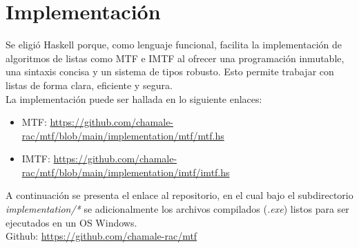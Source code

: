 \section{Implementación}

Se eligió Haskell porque, como lenguaje funcional, facilita la implementación de algoritmos de listas como MTF e IMTF al ofrecer una programación inmutable, una sintaxis concisa y un sistema de tipos robusto. Esto permite trabajar con listas de forma clara, eficiente y segura.\\

La implementación puede ser hallada en lo siguiente enlaces:

\begin{itemize}
    \item MTF: \url{https://github.com/chamale-rac/mtf/blob/main/implementation/mtf/mtf.hs}
    \item IMTF: \url{https://github.com/chamale-rac/mtf/blob/main/implementation/imtf/imtf.hs}
\end{itemize}

A continuación se presenta el enlace al repositorio, en el cual bajo el subdirectorio \textit{implementation/*} se adicionalmente los archivos compilados (\textit{.exe}) listos para ser ejecutados en un OS Windows. \\

Github: \url{https://github.com/chamale-rac/mtf}